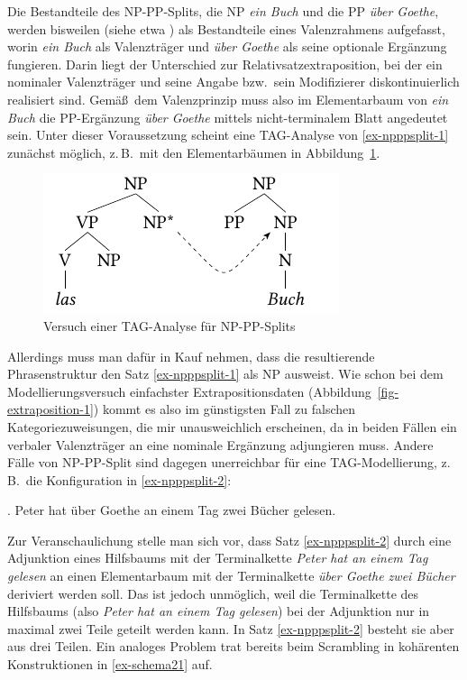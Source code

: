 Die Bestandteile des NP-PP-Splits, die NP {\it ein Buch} und die PP {\it über Goethe}, werden bisweilen (siehe etwa \citealt{DeKuthy:02}) als Bestandteile eines Valenzrahmens aufgefasst, worin {\it ein Buch} als Valenzträger und {\it über Goethe} als seine optionale Ergänzung fungieren. Darin liegt der Unterschied zur Relativsatzextraposition, bei der ein nominaler Valenzträger und seine  Angabe bzw.\ sein Modifizierer diskontinuierlich realisiert sind. Gemä\ss\ dem Valenzprinzip muss also im Elementarbaum von {\it ein Buch} die PP-Ergänzung {\it über Goethe} mittels nicht-terminalem Blatt angedeutet sein. Unter dieser Voraussetzung scheint eine TAG-Analyse von \ref{ex-npppsplit-1} zunächst möglich, z.\,B.\ mit den Elementarbäumen in Abbildung~\ref{fig-npppsplit-1}.
\begin{figure}[t]
\centering
\includegraphics{graphics/abb519.pdf}
\caption{\label{fig-npppsplit-1}Versuch einer TAG-Analyse für NP-PP-Splits}
\end{figure}
Allerdings muss man dafür in Kauf nehmen, dass die resultierende Phrasenstruktur den Satz \ref{ex-npppsplit-1} als NP ausweist. Wie schon bei dem Modellierungsversuch einfachster Extrapositionsdaten (Abbildung~\ref{fig-extraposition-1}) kommt es also im günstigsten Fall zu falschen Kategoriezuweisungen, die mir unausweichlich erscheinen, da in beiden Fällen ein verbaler Valenzträger an eine nominale Ergänzung adjungieren muss. Andere Fälle von NP-PP-Split sind dagegen unerreichbar für eine TAG-Modellierung, z.\,B.\ die Konfiguration in \ref{ex-npppsplit-2}: 

\ex. \label{ex-npppsplit-2} Peter hat über Goethe an einem Tag zwei Bücher gelesen.

Zur Veranschaulichung stelle man sich vor, dass Satz \ref{ex-npppsplit-2}  durch eine Adjunktion eines Hilfsbaums mit der Terminalkette  {\it Peter hat an einem Tag gelesen} an einen Elementarbaum mit der Terminalkette {\it über Goethe zwei Bücher} deriviert werden soll. Das ist jedoch unmöglich, weil die Terminalkette des Hilfsbaums (also {\it Peter hat an einem Tag gelesen}) bei der Adjunktion nur in maximal zwei Teile geteilt werden kann. In Satz \ref{ex-npppsplit-2} besteht sie aber aus drei Teilen. Ein analoges Problem trat bereits beim Scrambling in kohärenten Konstruktionen in \ref{ex-schema21} auf. 

